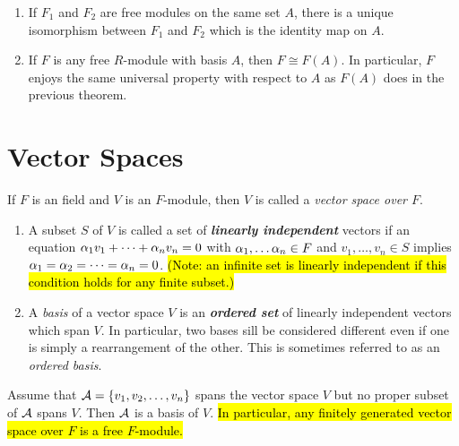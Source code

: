 \nl

\begin{cor}\nl
\begin{enumerate}
\item If $F_1$ and $F_2$ are free modules on the same set $A$, there is a unique isomorphism between $F_1$ and $F_2$ which is the identity map on $A$.
\item If $F$ is any free $R$-module with basis $A$, then $F\cong F(A)$. In particular, $F$ enjoys the same universal property with respect to $A$ as $F(A)$ does in the previous theorem.
\end{enumerate}
\end{cor}



\section{Vector Spaces}
\setcounter{thm}{0}

\begin{defn}
If $F$ is an field and $V$ is an $F$-module, then $V$ is called a \textit{vector space over $F$}.
\end{defn}

\nl

\begin{defn}\nl
\begin{enumerate}
\item A subset $S$ of $V$ is called a set of \textbf{\textit{linearly independent}} vectors if an equation $\alpha_1v_1+\cdots +\alpha_nv_n = 0$ with $\alpha_1,\ldots \alpha_n\in F$ and $v_1,\ldots, v_n\in S$ implies $\alpha_1 = \alpha_2 = \cdots = \alpha_n = 0$. \hl{(Note: an infinite set is linearly independent if this condition holds for any finite subset.)}
\item A \textit{basis} of a vector space $V$ is an \textbf{\textit{ordered set}} of linearly independent vectors which span $V$. In particular, two bases sill be considered different even if one is simply a rearrangement of the other. This is sometimes referred to as an \textit{ordered basis}.
\end{enumerate}
\end{defn}

\nl

\begin{prop}
Assume that $\mathcal{A} = \{v_1,v_2,\ldots, v_n\}$ spans the vector space $V$ but no proper subset of $\mathcal{A}$ spans $V$. Then $\mathcal{A}$ is a basis of $V$. \hl{In particular, any finitely generated vector space over $F$ is a free $F$-module.}
\end{prop}

